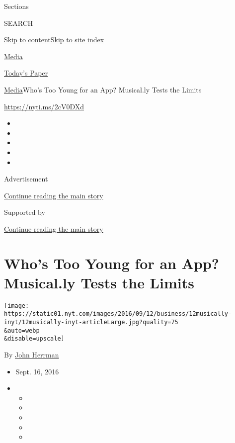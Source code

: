 Sections

SEARCH

\protect\hyperlink{site-content}{Skip to
content}\protect\hyperlink{site-index}{Skip to site index}

\href{https://www.nytimes.com/pages/business/media/index.html}{Media}

\href{https://myaccount.nytimes.com/auth/login?response_type=cookie\&client_id=vi}{}

\href{https://www.nytimes.com/section/todayspaper}{Today's Paper}

\href{/pages/business/media/index.html}{Media}\textbar{}Who's Too Young
for an App? Musical.ly Tests the Limits

\url{https://nyti.ms/2cV0DXd}

\begin{itemize}
\item
\item
\item
\item
\item
\end{itemize}

Advertisement

\protect\hyperlink{after-top}{Continue reading the main story}

Supported by

\protect\hyperlink{after-sponsor}{Continue reading the main story}

\hypertarget{whos-too-young-for-an-app-musically-tests-the-limits}{%
\section{Who's Too Young for an App? Musical.ly Tests the
Limits}\label{whos-too-young-for-an-app-musically-tests-the-limits}}

\texttt{[image: https://static01.nyt.com/images/2016/09/12/business/12musically-inyt/12musically-inyt-articleLarge.jpg?quality=75\\\&auto=webp\\\&disable=upscale]}

By \href{https://www.nytimes.com/by/john-herrman}{John Herrman}

\begin{itemize}
\item
  Sept. 16, 2016
\item
  \begin{itemize}
  \item
  \item
  \item
  \item
  \item
  \end{itemize}
\end{itemize}

